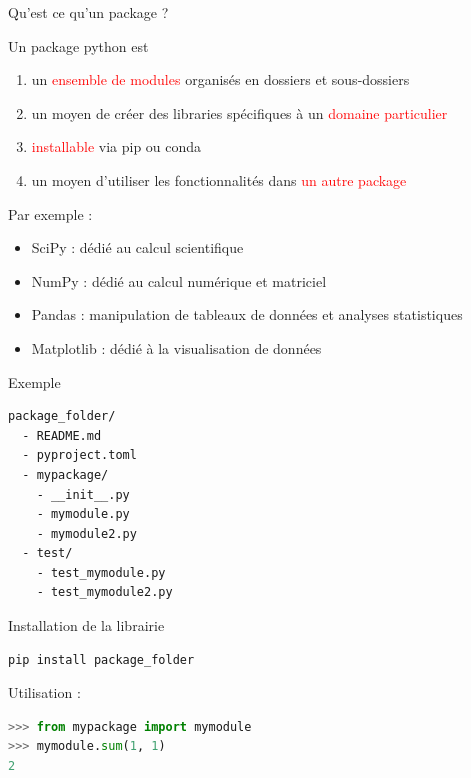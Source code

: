 \documentclass[10pt]{beamer}
\begin{document}
\begin{frame}[fragile]{Qu'est ce qu'un package ?}

  \begin{block}{Un package python est }
    \medskip
    \begin{enumerate}
      \item un \textcolor{red}{ensemble de modules} organisés en dossiers et sous-dossiers
      \item un moyen de créer des libraries spécifiques à un \textcolor{red}{domaine particulier}
      \item \textcolor{red}{installable} via pip ou conda
      \item un moyen d'utiliser les fonctionnalités dans \textcolor{red}{un autre package}
    \end{enumerate}

    Par exemple :
    \begin{itemize}
      \item SciPy : dédié au calcul scientifique
      \item NumPy : dédié au calcul numérique et matriciel
      \item Pandas : manipulation de tableaux de données et analyses statistiques
      \item Matplotlib : dédié à la visualisation de données
    \end{itemize}
  \end{block}
  

\end{frame}


\begin{frame}[fragile]{Exemple}

\begin{lstlisting}[numbers=none]
package_folder/
  - README.md	
  - pyproject.toml
  - mypackage/
    - __init__.py
    - mymodule.py
    - mymodule2.py
  - test/
    - test_mymodule.py
    - test_mymodule2.py
\end{lstlisting}

Installation de la librairie
\begin{lstlisting}[numbers=none]
pip install package_folder
\end{lstlisting}

Utilisation :
\begin{lstlisting}[language=python, numbers=none]
>>> from mypackage import mymodule
>>> mymodule.sum(1, 1)
2
\end{lstlisting}
\end{frame}
\end{document}

